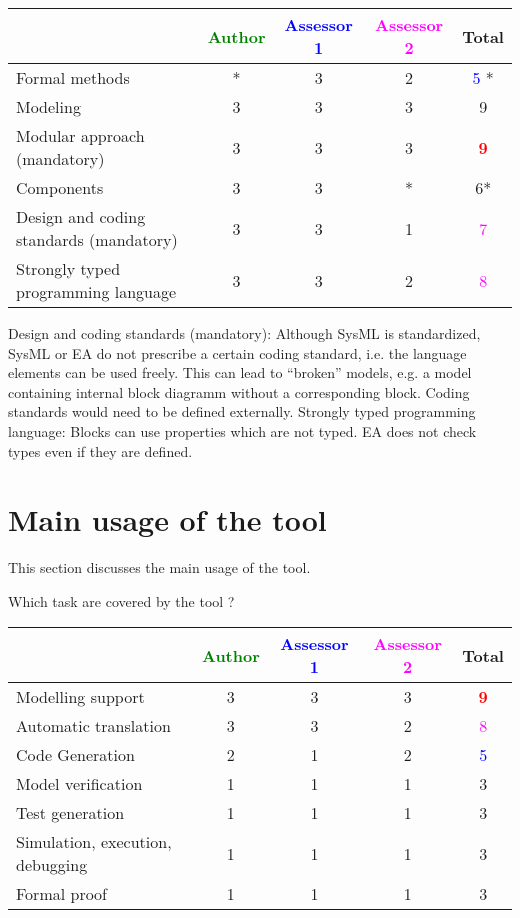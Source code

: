 \begin{tabular}{|l | c | c | c | c|}
\hline
& \textcolor{green}{Author} & \textcolor{blue}{Assessor 1} & \textcolor{magenta}{Assessor 2} & Total \\
\hline
Formal methods  &* & 3    &  2& \textcolor{blue}{5} * \\
\hline 
Modeling  &3 & 3    & 3     &  9 \\
\hline
Modular approach (mandatory) &3 & 3    & 3    & \textcolor{red}{\textbf{9}} \\
\hline
Components &3 & 3    & * &  6* \\
\hline
Design and coding standards (mandatory) &3 & 3    & 1    & \textcolor{magenta}{7} \\
\hline
Strongly typed programming language &3 & 3    & 2     & \textcolor{magenta}{8}  \\
\hline

\end{tabular}

\begin{assessor2}
Design and coding standards (mandatory): Although SysML is standardized, SysML or EA do not prescribe a certain coding standard, i.e. the language elements can be used freely. This can lead to "`broken"' models, e.g. a model containing internal block diagramm without a corresponding block. Coding standards would need to be defined externally.
Strongly typed programming language: Blocks can use properties which are not typed. EA does not check types even if they are defined.
\end{assessor2}


\section{Main usage of the tool}
\label{main_usage}

This section discusses the main usage of the tool.

Which task are covered by the tool ?


\begin{tabular}{|l | c | c | c | c|}
\hline
& \textcolor{green}{Author} & \textcolor{blue}{Assessor 1} & \textcolor{magenta}{Assessor 2} & Total \\
\hline 
Modelling support &3 & 3    & 3    & \textcolor{red}{\textbf{9}} \\
\hline
Automatic translation  &3 & 3    & 2    & \textcolor{magenta}{8} \\
\hline
Code Generation  &2 & 1    & 2    & \textcolor{blue}{5} \\
\hline
Model verification &1 & 1    & 1    & 3     \\
\hline
Test generation &1 & 1    & 1    & 3     \\
\hline
Simulation, execution, debugging &1 & 1    & 1    & 3     \\
\hline
Formal proof &1 & 1    & 1    & 3     \\
\hline
\end{tabular}

